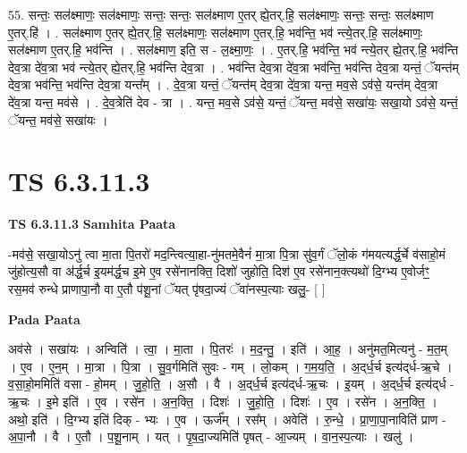 \documentclass[17pt]{extarticle}
\begin{document}
55. सन्तः॒ सल॑क्ष्माणः॒ सल॑क्ष्माणः॒ सन्तः॒ सन्तः॒ सल॑क्ष्माण ए॒तर् ह्ये॒तर्.हि॒ सल॑क्ष्माणः॒ सन्तः॒ सन्तः॒ सल॑क्ष्माण ए॒तर्.हि॑ । . सल॑क्ष्माण ए॒तर् ह्ये॒तर्.हि॒ सल॑क्ष्माणः॒ सल॑क्ष्माण ए॒तर्.हि॒ भव॑न्ति॒ भव॑ न्त्ये॒तर्.हि॒ सल॑क्ष्माणः॒ सल॑क्ष्माण ए॒तर्.हि॒ भव॑न्ति । . सल॑क्ष्माण॒ इति॒ स - ल॒क्ष्मा॒णः॒ । . ए॒तर्.हि॒ भव॑न्ति॒ भव॑ न्त्ये॒तर् ह्ये॒तर्.हि॒ भव॑न्ति देव॒त्रा दे॑व॒त्रा भव॑ न्त्ये॒तर् ह्ये॒तर्.हि॒ भव॑न्ति देव॒त्रा । . भव॑न्ति देव॒त्रा दे॑व॒त्रा भव॑न्ति॒ भव॑न्ति देव॒त्रा यन्तं॒ ॅयन्त॑म् देव॒त्रा भव॑न्ति॒ भव॑न्ति देव॒त्रा यन्त᳚म् । . दे॒व॒त्रा यन्तं॒ ॅयन्त॑म् देव॒त्रा दे॑व॒त्रा यन्त॒ मव॒से ऽव॑से॒ यन्त॑म् देव॒त्रा दे॑व॒त्रा यन्त॒ मव॑से । . दे॒व॒त्रेति॑ देव - त्रा । . यन्त॒ मव॒से ऽव॑से॒ यन्तं॒ ॅयन्त॒ मव॑से॒ सखा॑यः॒ सखा॒यो ऽव॑से॒ यन्तं॒ ॅयन्त॒ मव॑से॒ सखा॑यः । \newline
\pagebreak
{}

\section{ TS 6.3.11.3 }

\textbf{TS 6.3.11.3 } \newline
\textbf{Samhita Paata} \newline

-मव॑से॒ सखा॒योऽनु॑ त्वा मा॒ता पि॒तरो॑ मद॒न्त्वित्या॒हा-नु॑मतमे॒वैनं॑ मा॒त्रा पि॒त्रा सु॑व॒र्गं ॅलो॒कं ग॑मयत्यर्द्ध॒र्चे व॑साहो॒मं जु॑होत्य॒सौ वा अ॑र्द्ध॒र्च इ॒यम॑र्द्ध॒च इ॒मे ए॒व रसे॑नानक्ति॒ दिशो॑ जुहोति॒ दिश॑ ए॒व रसे॑नान॒क्त्यथो॑ दि॒ग्भ्य ए॒वोर्जꣳ॒॒ रस॒मव॑ रुन्धे प्राणापा॒नौ वा ए॒तौ प॑शू॒नां ॅयत् पृ॑षदा॒ज्यं ॅवा॑नस्प॒त्याः खलु॒- [  ] \newline

\textbf{Pada Paata} \newline

अव॑से । सखा॑यः । अन्विति॑ । त्वा॒ । मा॒ता । पि॒तरः॑ । म॒द॒न्तु॒ । इति॑ । आ॒ह॒ । अनु॑मत॒मित्यनु॑ - म॒त॒म् । ए॒व । ए॒न॒म् । मा॒त्रा । पि॒त्रा । सु॒व॒र्गमिति॑ सुवः - गम् । लो॒कम् । ग॒म॒य॒ति॒ । अ॒द्‌र्ध॒र्च इत्य॑द्‌र्ध-ऋ॒चे । व॒सा॒हो॒ममिति॑ वसा - हो॒मम् । जु॒हो॒ति॒ । अ॒सौ । वै । अ॒द्‌र्ध॒र्च इत्य॑द्‌र्ध-ऋ॒चः । इ॒यम् । अ॒द्‌र्ध॒र्च इत्य॑द्‌र्ध - ऋ॒चः । इ॒मे इति॑ । ए॒व । रसे॑न । अ॒न॒क्ति॒ । दिशः॑ । जु॒हो॒ति॒ । दिशः॑ । ए॒व । रसे॑न । अ॒न॒क्ति॒ । अथो॒ इति॑ । दि॒ग्भ्य इति॑ दिक् - भ्यः । ए॒व । ऊर्ज᳚म् । रस᳚म् । अवेति॑ । रु॒न्धे॒ । प्रा॒णा॒पा॒नाविति॑ प्राण - अ॒पा॒नौ । वै । ए॒तौ । प॒शू॒नाम् । यत् । पृ॒ष॒दा॒ज्यमिति॑ पृषत् - आ॒ज्यम् । वा॒न॒स्प॒त्याः । खलु॑ ।  \newline
\end{document}

